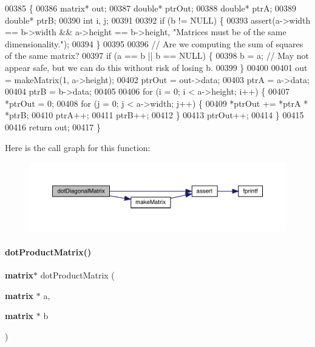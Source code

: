 \begin{DoxyCode}
00385                                                 \{
00386     matrix* out;
00387     \textcolor{keywordtype}{double}* ptrOut;
00388     \textcolor{keywordtype}{double}* ptrA;
00389     \textcolor{keywordtype}{double}* ptrB;
00390     \textcolor{keywordtype}{int} i, j;
00391 
00392     \textcolor{keywordflow}{if} (b != NULL) \{
00393         assert(a->width == b->width && a->height == b->height, \textcolor{stringliteral}{"Matrices must be of the same
       dimensionality."});
00394     \}
00395 
00396     \textcolor{comment}{// Are we computing the sum of squares of the same matrix?}
00397     \textcolor{keywordflow}{if} (a == b || b == NULL) \{
00398         b = a; \textcolor{comment}{// May not appear safe, but we can do this without risk of losing b.}
00399     \}
00400 
00401     out = makeMatrix(1, a->height);
00402     ptrOut = out->data;
00403     ptrA = a->data;
00404     ptrB = b->data;
00405 
00406     \textcolor{keywordflow}{for} (i = 0; i < a->height; i++) \{
00407         *ptrOut = 0;
00408         \textcolor{keywordflow}{for} (j = 0; j < a->width; j++) \{
00409             *ptrOut += *ptrA * *ptrB;
00410             ptrA++;
00411             ptrB++;
00412         \}
00413         ptrOut++;
00414     \}
00415 
00416     \textcolor{keywordflow}{return} out;
00417 \}
\end{DoxyCode}
Here is the call graph for this function\+:\nopagebreak
\begin{figure}[H]
\begin{center}
\leavevmode
\includegraphics[width=350pt]{matrix_8c_af49b525d7476c365833db9acd975e3a5_cgraph}
\end{center}
\end{figure}
\mbox{\label{matrix_8c_a0b568a64e81a56779c2141b424475976}} 
\paragraph{dot\+Product\+Matrix()}
{\footnotesize\ttfamily \textbf{ matrix}$\ast$ dot\+Product\+Matrix (\begin{DoxyParamCaption}\item[{\textbf{ matrix} $\ast$}]{a,  }\item[{\textbf{ matrix} $\ast$}]{b }\end{DoxyParamCaption})}



